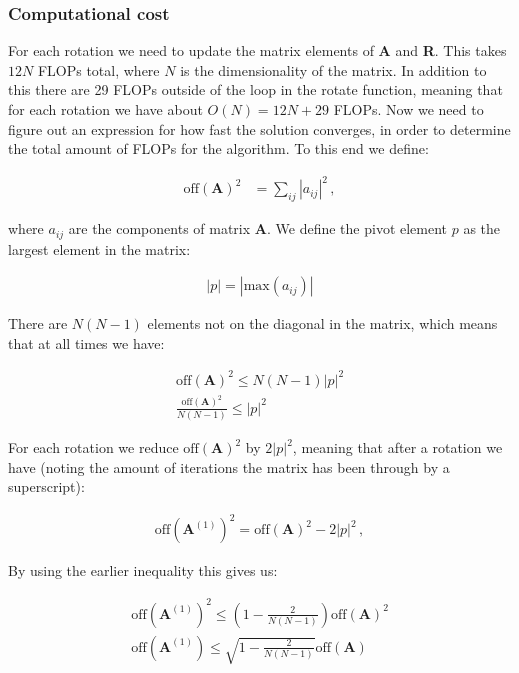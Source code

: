 \documentclass[reprint,english,notitlepage]{revtex4-1}  %
\begin{document}
\subsubsection{Computational cost} \label{sec:III:a:i}

For each rotation we need to update the matrix elements of \textbf{A} and \textbf{R}. This takes $12N$ FLOPs total, where $N$ is the dimensionality of the matrix. In addition to this there are 29 FLOPs outside of the loop in the rotate function, meaning that for each rotation we have about $O(N) = 12N + 29$ FLOPs. Now we need to figure out an expression for how fast the solution converges, in order to determine the total amount of FLOPs for the algorithm. To this end we define:

\begin{align*}
\text{off}(\textbf{A})^2 &= \sum\limits_{ij} |a_{ij}|^2 \, ,
\end{align*}

where $a_{ij}$ are the components of matrix \textbf{A}. We define the pivot element $p$ as the largest element in the matrix:

\begin{align*}
|p| = |\text{max}(a_{ij})|
\end{align*}

There are $N(N-1)$ elements not on the diagonal in the matrix, which means that at all times we have:

\begin{align*}
\text{off}(\textbf{A})^2 \leq N(N-1)|p|^2 \\
\frac{\text{off}(\textbf{A})^2}{N(N-1)} \leq |p|^2
\end{align*}

For each rotation we reduce $\text{off}(\textbf{A})^2$ by $2|p|^2$, meaning that after a rotation we have (noting the amount of iterations the matrix has been through by a superscript):

\begin{align*}
\text{off}(\textbf{A}^{(1)})^2 = \text{off}(\textbf{A})^2 - 2|p|^2 \, ,
\end{align*}

By using the earlier inequality this gives us:

\begin{align*}
\text{off}(\textbf{A}^{(1)})^2 \leq (1 - \frac{2}{N(N-1)}) \text{off}(\textbf{A})^2 \\
\text{off}(\textbf{A}^{(1)}) \leq \sqrt{1 - \frac{2}{N(N-1)}} \text{off}(\textbf{A}) 
\end{align*}
\end{document}
